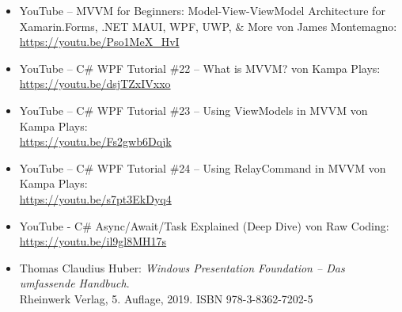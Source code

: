 \begin{itemize}
\item YouTube – MVVM for Beginners: Model-View-ViewModel Architecture for Xamarin.Forms, .NET MAUI, WPF, UWP, \& More von James Montemagno:\\
\url{https://youtu.be/Pso1MeX_HvI}

\item YouTube – C\# WPF Tutorial \#22 – What is MVVM? von Kampa Plays:\\
\url{https://youtu.be/dsjTZxIVxxo}

\item YouTube – C\# WPF Tutorial \#23 – Using ViewModels in MVVM von Kampa Plays:\\
\url{https://youtu.be/Fs2gwb6Dqjk}

\item YouTube – C\# WPF Tutorial \#24 – Using RelayCommand in MVVM von Kampa Plays:\\
\url{https://youtu.be/s7pt3EkDyq4}

\item YouTube - C\# Async/Await/Task Explained (Deep Dive) von Raw Coding:\\ 
\url{https://youtu.be/il9gl8MH17s}


\item Thomas Claudius Huber: \textit{Windows Presentation Foundation – Das umfassende Handbuch}.\\
Rheinwerk Verlag, 5. Auflage, 2019. ISBN 978-3-8362-7202-5

\end{itemize}

\vspace{0.5cm}
